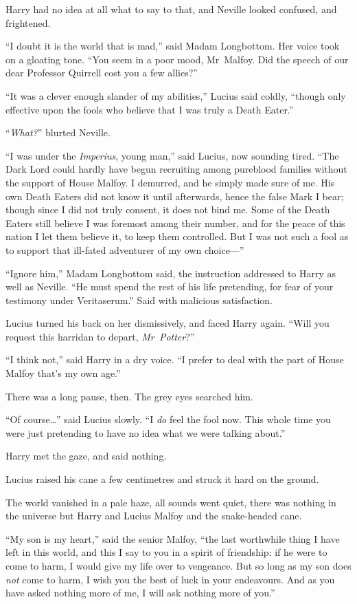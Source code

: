 Harry had no idea at all what to say to that, and Neville looked confused, and frightened.

“I doubt it is the world that is mad,” said Madam Longbottom. Her voice took on a gloating tone. “You seem in a poor mood, Mr~Malfoy. Did the speech of our dear Professor Quirrell cost you a few allies?”

“It was a clever enough slander of my abilities,” Lucius said coldly, “though only effective upon the fools who believe that I was truly a Death Eater.”

“\emph{What?}” blurted Neville.

“I was under the \emph{Imperius}, young man,” said Lucius, now sounding tired. “The Dark Lord could hardly have begun recruiting among pureblood families without the support of House Malfoy. I demurred, and he simply made sure of me. His own Death Eaters did not know it until afterwards, hence the false Mark I bear; though since I did not truly consent, it does not bind me. Some of the Death Eaters still believe I was foremost among their number, and for the peace of this nation I let them believe it, to keep them controlled. But I was not such a fool as to support that ill-fated adventurer of my own choice—”

“Ignore him,” Madam Longbottom said, the instruction addressed to Harry as well as Neville. “He must spend the rest of his life pretending, for fear of your testimony under Veritaserum.” Said with malicious satisfaction.

Lucius turned his back on her dismissively, and faced Harry again. “Will you request this harridan to depart, \emph{Mr~Potter}?”

“I think not,” said Harry in a dry voice. “I prefer to deal with the part of House Malfoy that’s my own age.”

There was a long pause, then. The grey eyes searched him.

“Of course…” said Lucius slowly. “I \emph{do} feel the fool now. This whole time you were just pretending to have no idea what we were talking about.”

Harry met the gaze, and said nothing.

Lucius raised his cane a few centimetres and struck it hard on the ground.

The world vanished in a pale haze, all sounds went quiet, there was nothing in the universe but Harry and Lucius Malfoy and the snake-headed cane.

“My son is my heart,” said the senior Malfoy, “the last worthwhile thing I have left in this world, and this I say to you in a spirit of friendship: if he were to come to harm, I would give my life over to vengeance. But so long as my son does \emph{not} come to harm, I wish you the best of luck in your endeavours. And as you have asked nothing more of me, I will ask nothing more of you.”

